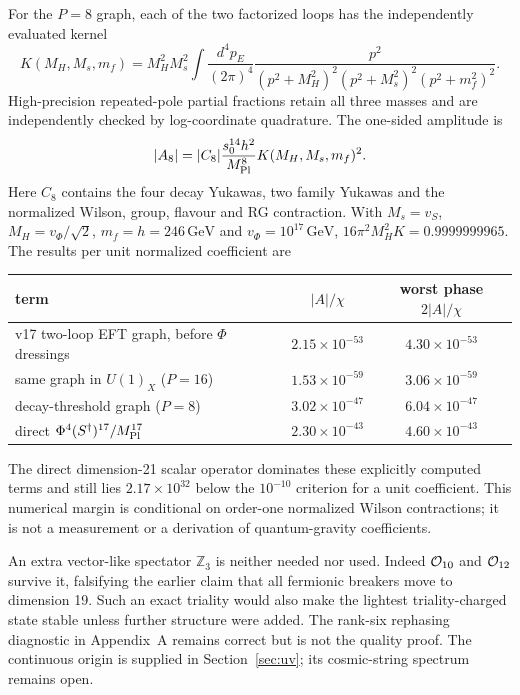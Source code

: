 \documentclass[11pt,a4paper]{article}
\newcommand{\GeV}{\,\mathrm{GeV}}
\begin{document}
For the $P=8$ graph, each of the two factorized loops has the independently
evaluated kernel
\begin{equation}
 K(M_H,M_s,m_f)=M_H^2M_s^2\int\frac{d^4p_E}{(2\pi)^4}
 \frac{p^2}{(p^2+M_H^2)^2(p^2+M_s^2)^2(p^2+m_f^2)^2}.
\label{eq:chain}
\end{equation}
High-precision repeated-pole partial fractions retain all three masses and
are independently checked by log-coordinate quadrature. The one-sided
amplitude is
\begin{equation}
 |A_8|=|C_8|\frac{s_0^{14}h^2}{M_{\rm Pl}^{8}}
 K(M_H,M_s,m_f)^2.
\label{eq:fullp8}
\end{equation}
Here $C_8$ contains the four decay Yukawas, two family Yukawas and the
normalized Wilson, group, flavour and RG contraction. With $M_s=v_S$,
$M_H=v_\Phi/\sqrt2$, $m_f=h=246\GeV$ and $v_\Phi=10^{17}\GeV$,
$16\pi^2M_H^2K=0.9999999965$. The results per unit normalized
coefficient are
\begin{center}
\begin{tabular}{lcc}
\toprule
term & $|A|/\chi$ & worst phase $2|A|/\chi$\\
\midrule
v17 two-loop EFT graph, before $\Phi$ dressings & $2.15\times10^{-53}$ &
$4.30\times10^{-53}$\\
same graph in $U(1)_X$ ($P=16$) & $1.53\times10^{-59}$ &
$3.06\times10^{-59}$\\
decay-threshold graph ($P=8$) & $3.02\times10^{-47}$ &
$6.04\times10^{-47}$\\
direct $\Phi^4(S^\dagger)^{17}/M_{\rm Pl}^{17}$ &
$2.30\times10^{-43}$ & $4.60\times10^{-43}$\\
\bottomrule
\end{tabular}
\end{center}
The direct dimension-21 scalar operator dominates these explicitly
computed terms and still lies $2.17\times10^{32}$ below the
$10^{-10}$ criterion for a unit coefficient. This numerical margin is
conditional on order-one normalized Wilson contractions; it is not a
measurement or a derivation of quantum-gravity coefficients.

An extra vector-like spectator $\mathbb Z_3$ is neither needed nor used.
Indeed ${\cal O}_{10}$ and ${\cal O}_{12}$ survive it, falsifying the
earlier claim that all fermionic breakers move to dimension 19. Such an
exact triality would also make the lightest triality-charged state stable
unless further structure were added. The rank-six rephasing diagnostic
in Appendix~A remains correct but is not the quality proof. The continuous
origin is supplied in Section~\ref{sec:uv}; its cosmic-string spectrum
remains open.
\end{document}
